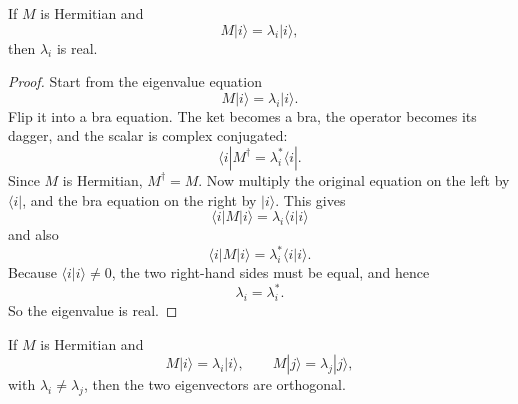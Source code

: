 \begin{proposition}
If \(M\) is Hermitian and
\begin{equation}
M|i\rangle=\lambda_i |i\rangle,
\end{equation}
then \(\lambda_i\) is real.
\end{proposition}

\begin{proof}
Start from the eigenvalue equation
\begin{equation}
M|i\rangle=\lambda_i |i\rangle.
\end{equation}
Flip it into a bra equation. The ket becomes a bra, the operator becomes its dagger, and the scalar is complex conjugated:
\begin{equation}
\langle i|M^\dagger=\lambda_i^*\langle i|.
\end{equation}
Since \(M\) is Hermitian, \(M^\dagger=M\). Now multiply the original equation on the left by \(\langle i|\), and the bra equation on the right by \(|i\rangle\). This gives
\begin{equation}
\langle i|M|i\rangle=\lambda_i \langle i|i\rangle
\end{equation}
and also
\begin{equation}
\langle i|M|i\rangle=\lambda_i^* \langle i|i\rangle.
\end{equation}
Because \(\langle i|i\rangle\neq 0\), the two right-hand sides must be equal, and hence
\begin{equation}
\lambda_i=\lambda_i^*.
\end{equation}
So the eigenvalue is real.
\end{proof}

\begin{proposition}
If \(M\) is Hermitian and
\begin{equation}
M|i\rangle=\lambda_i |i\rangle,
\qquad
M|j\rangle=\lambda_j |j\rangle,
\end{equation}
with \(\lambda_i\neq\lambda_j\), then the two eigenvectors are orthogonal.
\end{proposition}

